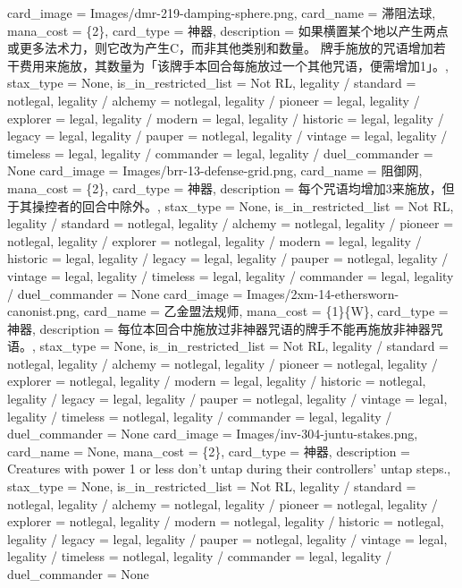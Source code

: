 \documentclass[lang = cn, color = black, 10pt]{AllThatStax}
\begin{document}
\card
{
	card_image = Images/dmr-219-damping-sphere.png,
	card_name = 滞阻法球,
	mana_cost = \{2\},
	card_type = 神器,
	description = 如果横置某个地以产生两点或更多法术力，则它改为产生{C}，而非其他类别和数量。
	牌手施放的咒语增加若干费用来施放，其数量为「该牌手本回合每施放过一个其他咒语，便需增加{1}」。,
	stax_type = None,
	is_in_restricted_list = Not RL,
	legality / standard = notlegal,
	legality / alchemy = notlegal,
	legality / pioneer = legal,
	legality / explorer = legal,
	legality / modern = legal,
	legality / historic = legal,
	legality / legacy = legal,
	legality / pauper = notlegal,
	legality / vintage = legal,
	legality / timeless = legal,
	legality / commander = legal,
	legality / duel_commander = None
}
\card
{
	card_image = Images/brr-13-defense-grid.png,
	card_name = 阻御网,
	mana_cost = \{2\},
	card_type = 神器,
	description = 每个咒语均增加{3}来施放，但于其操控者的回合中除外。,
	stax_type = None,
	is_in_restricted_list = Not RL,
	legality / standard = notlegal,
	legality / alchemy = notlegal,
	legality / pioneer = notlegal,
	legality / explorer = notlegal,
	legality / modern = legal,
	legality / historic = legal,
	legality / legacy = legal,
	legality / pauper = notlegal,
	legality / vintage = legal,
	legality / timeless = legal,
	legality / commander = legal,
	legality / duel_commander = None
}
\card
{
	card_image = Images/2xm-14-ethersworn-canonist.png,
	card_name = 乙金盟法规师,
	mana_cost = \{1\}\{W\},
	card_type = 神器,
	description = 每位本回合中施放过非神器咒语的牌手不能再施放非神器咒语。,
	stax_type = None,
	is_in_restricted_list = Not RL,
	legality / standard = notlegal,
	legality / alchemy = notlegal,
	legality / pioneer = notlegal,
	legality / explorer = notlegal,
	legality / modern = legal,
	legality / historic = notlegal,
	legality / legacy = legal,
	legality / pauper = notlegal,
	legality / vintage = legal,
	legality / timeless = notlegal,
	legality / commander = legal,
	legality / duel_commander = None
}
\card
{
	card_image = Images/inv-304-juntu-stakes.png,
	card_name = None,
	mana_cost = \{2\},
	card_type = 神器,
	description = Creatures with power 1 or less don't untap during their controllers' untap steps.,
	stax_type = None,
	is_in_restricted_list = Not RL,
	legality / standard = notlegal,
	legality / alchemy = notlegal,
	legality / pioneer = notlegal,
	legality / explorer = notlegal,
	legality / modern = notlegal,
	legality / historic = notlegal,
	legality / legacy = legal,
	legality / pauper = notlegal,
	legality / vintage = legal,
	legality / timeless = notlegal,
	legality / commander = legal,
	legality / duel_commander = None
}
\end{document}
